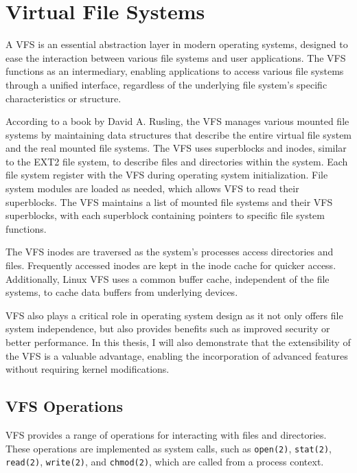 \section{Virtual File Systems}\label{sec:virtual-file-systems}

A VFS is an essential abstraction layer in modern operating systems, designed to ease the interaction between various file systems and user applications.
The VFS functions as an intermediary, enabling applications to access various file systems through a unified interface, regardless of the underlying file system's specific characteristics or structure.

According to a book by David A. Rusling\cite{rusling-linux}, the VFS manages various mounted file systems by maintaining data structures that describe the entire virtual file system and the real mounted file systems.
The VFS uses superblocks and inodes, similar to the EXT2 file system, to describe files and directories within the system.
Each file system register with the VFS during operating system initialization.
File system modules are loaded as needed, which allows VFS to read their superblocks.
The VFS maintains a list of mounted file systems and their VFS superblocks, with each superblock containing pointers to specific file system functions.

The VFS inodes are traversed as the system's processes access directories and files.
Frequently accessed inodes are kept in the inode cache for quicker access.
Additionally, Linux VFS uses a common buffer cache, independent of the file systems, to cache data buffers from underlying devices.

VFS also plays a critical role in operating system design as it not only offers file system independence, but also provides benefits such as improved security or better performance.
In this thesis, I will also demonstrate that the extensibility of the VFS is a valuable advantage, enabling the incorporation of advanced features without requiring kernel modifications.

\subsection{VFS Operations}\label{subsec:vfs-operations}

VFS provides a range of operations for interacting with files and directories.
These operations are implemented as system calls, such as \texttt{open(2)}, \texttt{stat(2)}, \texttt{read(2)}, \texttt{write(2)}, and \texttt{chmod(2)}, which are called from a process context.

